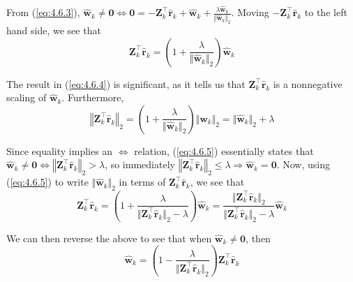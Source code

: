 \documentclass{article}
\numberwithin{equation}{section}
\begin{document}
From (\ref{eq:4.6.3}), $ \hat{\mathbf{w}}_k \ne \mathbf{0} \Leftrightarrow
\mathbf{0} = -\mathbf{Z}_k^\top\hat{\mathbf{r}}_k + \hat{\mathbf{w}}_k +
\frac{\lambda\hat{\mathbf{w}}_k}{\Vert\hat{\mathbf{w}}_k\Vert_2} $. Moving
$ -\mathbf{Z}_k^\top\hat{\mathbf{r}}_k $ to the left hand side, we see that
\begin{equation} \label{eq:4.6.4}
    \mathbf{Z}_k^\top\hat{\mathbf{r}}_k =
    \left(1 + \frac{\lambda}{\Vert\hat{\mathbf{w}}_k\Vert_2}\right)
    \hat{\mathbf{w}}_k
\end{equation}

The result in (\ref{eq:4.6.4}) is significant, as it tells us that
$ \mathbf{Z}_k^\top\hat{\mathbf{r}}_k $ is a nonnegative scaling of
$ \hat{\mathbf{w}}_k $. Furthermore,
\begin{equation} \label{eq:4.6.5}
    \left\Vert\mathbf{Z}_k^\top\hat{\mathbf{r}}_k\right\Vert_2 =
    \left(1 + \frac{\lambda}{\Vert\hat{\mathbf{w}}_k\Vert_2}\right)
    \Vert\hat{\mathbf{w}}_k\Vert_2 =
    \Vert\hat{\mathbf{w}}_k\Vert_2 + \lambda
\end{equation}

Since equality implies an $ \Leftrightarrow $ relation, (\ref{eq:4.6.5})
essentially states that $ \hat{\mathbf{w}}_k \ne \mathbf{0} \Leftrightarrow
\left\Vert\mathbf{Z}_k^\top\hat{\mathbf{r}}_k\right\Vert_2 > \lambda $, so
immediately $ \left\Vert\mathbf{Z}_k^\top\hat{\mathbf{r}}_k\right\Vert_2 \le
\lambda \Rightarrow \hat{\mathbf{w}}_k = \mathbf{0} $. Now, using
(\ref{eq:4.6.5}) to write $ \Vert\hat{\mathbf{w}}_k\Vert_2 $ in terms of
$ \mathbf{Z}_k^\top\hat{\mathbf{r}}_k $, we see that
\begin{equation*}
    \mathbf{Z}_k^\top\hat{\mathbf{r}}_k =
    \left(
        1 +
        \frac{
            \lambda
        }{
            \Vert\mathbf{Z}_k^\top\hat{\mathbf{r}}_k\Vert_2 - \lambda
        }
    \right)
    \hat{\mathbf{w}}_k =
    \frac{
        \Vert\mathbf{Z}_k^\top\hat{\mathbf{r}}_k\Vert_2
    }{
        \Vert\mathbf{Z}_k^\top\hat{\mathbf{r}}_k\Vert_2 - \lambda
    }
    \hat{\mathbf{w}}_k
\end{equation*}

We can then reverse the above to see that when
$ \hat{\mathbf{w}}_k \ne \mathbf{0} $, then
\begin{equation} \label{eq:4.6.6}
    \hat{\mathbf{w}}_k =
    \left(
        1 - \frac{\lambda}{\Vert\mathbf{Z}_k^\top\hat{\mathbf{r}}_k\Vert_2}
    \right)
    \mathbf{Z}_k^\top\hat{\mathbf{r}}_k
\end{equation}
\end{document}

